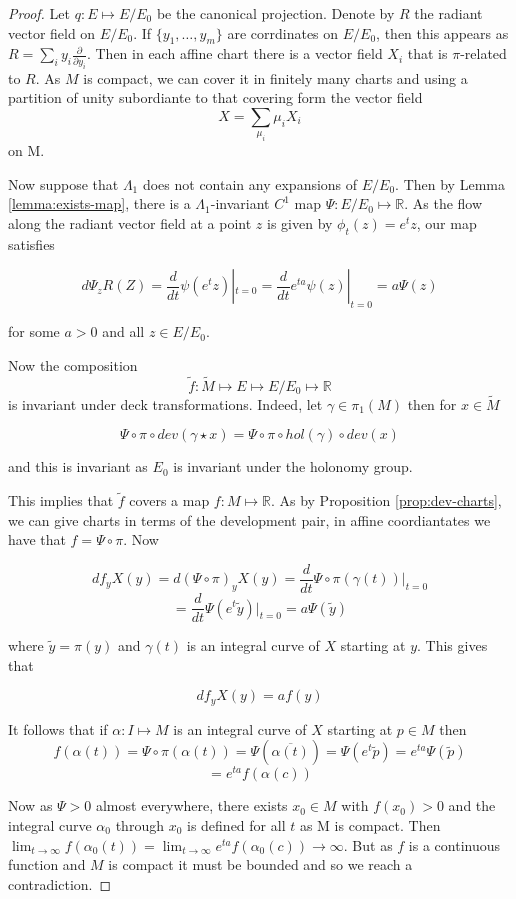 \begin{proof}
    \label{thm:expansion-in-holonomy}
    Let $q: E \mapsto E/E_0$ be the canonical projection. Denote by $R$ the radiant vector field on $E/E_0$. If $\{y_1,\dots , y_m\}$ are corrdinates
    on $E/E_0$, then this appears as $R = \sum_i y_i \frac{\partial}{\partial y_{i}}$.
    Then in each affine chart there is a vector field $X_i$ that is $\pi$-related to $R$. As $M$ is compact, we can cover it in finitely many
    charts and using a partition of unity subordiante to that covering form the vector field
    \[X = \sum_{\mu_i}\mu_i X_i\]
    on M.

    Now suppose that $\Lambda_1$ does not contain any expansions of $E/E_0$. Then
    by Lemma \ref{lemma:exists-map}, there is a $\Lambda_1$-invariant $C^1$ map
    $\Psi: E/E_0 \mapsto \mathbb{R}$. As the flow along the radiant vector field at
    a point $z$ is given by $\phi_t(z) = e^tz$, our map satisfies

    \[d\Psi_z R(Z) = \frac{d}{dt}\psi(e^tz)|_{t=0} = \frac{d}{dt} e^{ta}\psi(z)|_{t=0} = a\Psi(z)\]

    for some $a>0$ and all $z\in E/E_0$.

    Now the composition
    \[\tilde{f}: \tilde{M} \mapsto E \mapsto E/E_0 \mapsto \mathbb{R}\]
    is invariant under deck transformations. Indeed, let $\gamma \in \pi_1(M)$ then
    for $x \in \tilde{M}$

    \[\Psi\circ \pi \circ dev(\gamma \star x) = \Psi\circ \pi \circ hol(\gamma)\circ dev(x)\]

    and this is invariant as $E_0$ is invariant under the holonomy group.

    This implies that $\tilde{f}$ covers a map $f: M \mapsto \mathbb{R}$. As by
    Proposition \ref{prop:dev-charts}, we can give charts in terms of the
    development pair, in affine coordiantates we have that $f = \Psi \circ \pi$.
    Now

    \[df_y X(y) = d(\Psi \circ \pi)_y X(y) = \frac{d}{dt}\Psi \circ \pi (\gamma(t))|_{t=0}\]
    \[= \frac{d}{dt}\Psi(e^{t}\tilde{y})|_{t=0} = a\Psi(\tilde{y})\]

    where $\tilde{y} = \pi(y)$ and $\gamma(t)$ is an integral curve of $X$ starting
    at $y$. This gives that

    \[df_y X(y) = af(y)\]

    It follows that if $\alpha: I \mapsto M$ is an integral curve of $X$ starting
    at $p \in M$ then
    \[f(\alpha(t)) = \Psi\circ \pi (\alpha(t)) = \Psi(\overline{\alpha(t)}) = \Psi(e^t \tilde{p}) = e^{ta}\Psi(\tilde{p})\]
    \[= e^{ta}f(\alpha(c))\]

    Now as $\Psi > 0$ almost everywhere, there exists $x_0 \in M$ with $f(x_0)>0$
    and the integral curve $\alpha_0$ through $x_0$ is defined for all $t$ as M is
    compact. Then $\lim_{t \to \infty}f(\alpha_0 (t)) = \lim_{t \to \infty}
        e^{ta}f(\alpha_0(c)) \to \infty$. But as $f$ is a continuous function and $M$
    is compact it must be bounded and so we reach a contradiction.
\end{proof}


